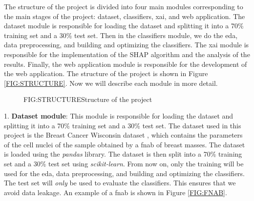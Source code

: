 
The structure of the project is divided into four main modules corresponding to the main stages of the project: dataset, classifiers, \ac{xai}, and web application. The dataset module is responsible for loading the dataset and splitting 
it into a 70\% training set and a 30\% test set. 
Then in the classifiers module, we do the \ac{eda}, data preprocessing, and building and optimizing the classifiers. The \ac{xai} module is responsible for the implementation of the SHAP algorithm and the analysis of the results. Finally, the web application module is responsible for the development of the web application. The structure of the project is shown in Figure \ref{FIG:STRUCTURE}. Now we will describe each module in more detail.

\begin{figure}[Structure of the project]{FIG:STRUCTURE}{Structure of the project}
\end{figure}

1. \textbf{Dataset module}: This module is responsible for loading the dataset and splitting it into a 70\% training set and a 30\% test set. The dataset used in this project is the Breast Cancer Wisconsin dataset \cite{william_wolberg_breast_1993}, which contains the parameters of the cell nuclei of the sample obtained by a \ac{fnab} of breast masses. The dataset is loaded using the \textit{pandas} library. The dataset is then split into a 70\% training set and a 30\% test set using \textit{scikit-learn}. From now on, only the training will be used for the \acl{eda}, data preprocessing, and building and optimizing the classifiers. The test set will \textit{only} be used to evaluate the classifiers. This ensures that we avoid data leakage. 
An example of a \ac{fnab} is shown in Figure \ref{FIG:FNAB}. 

